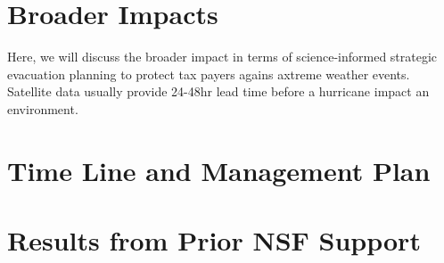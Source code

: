 \documentclass{proposalnsf}
\begin{document}
\section{Broader Impacts}
Here, we will discuss the broader impact in terms of science-informed strategic evacuation planning to protect tax payers agains axtreme weather events. Satellite data usually provide 24-48hr lead time before a hurricane impact an environment.

\section{Time Line and Management Plan}

\section{Results from Prior NSF Support}

\renewcommand{\thepage} {D--\arabic{page}}



\end{document}
